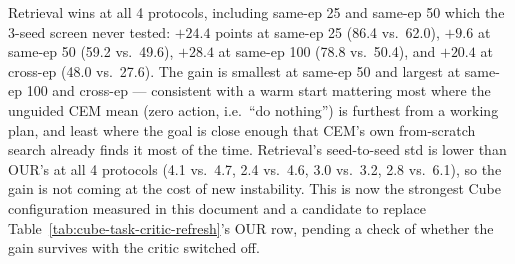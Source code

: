 \documentclass[11pt]{article}
\begin{document}
Retrieval wins at all 4 protocols, including same-ep 25 and same-ep 50 which the 3-seed screen
never tested: $+24.4$ points at same-ep 25 (86.4 vs.\ 62.0), $+9.6$ at same-ep 50 (59.2 vs.\
49.6), $+28.4$ at same-ep 100 (78.8 vs.\ 50.4), and $+20.4$ at cross-ep (48.0 vs.\ 27.6). The
gain is smallest at same-ep 50 and largest at same-ep 100 and cross-ep --- consistent with a
warm start mattering most where the unguided CEM mean (zero action, i.e.\ ``do nothing'') is
furthest from a working plan, and least where the goal is close enough that CEM's own
from-scratch search already finds it most of the time. Retrieval's seed-to-seed std is lower
than OUR's at all 4 protocols (4.1 vs.\ 4.7, 2.4 vs.\ 4.6, 3.0 vs.\ 3.2, 2.8 vs.\ 6.1), so the
gain is not coming at the cost of new instability. This is now the strongest Cube configuration
measured in this document and a candidate to replace Table~\ref{tab:cube-task-critic-refresh}'s
OUR row, pending a check of whether the gain survives with the critic switched off.
\end{document}
